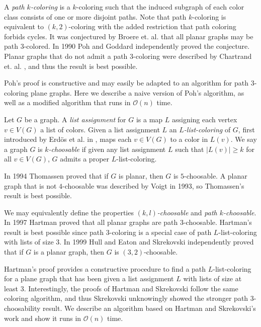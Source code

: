 \documentclass[letterpaper, 12pt]{article}
\theoremstyle{definition}
\theoremstyle{definition}
\theoremstyle{thm}
\theoremstyle{definition}
\begin{document}
A \textit{path $k$-coloring} is a
$k$-coloring such that the induced subgraph of each color class consists of one
or more disjoint paths. Note that path $k$-coloring is equivalent to
$(k,2)$-coloring with the added restriction that path coloring forbids cycles.
It was conjectured by Broere et. al. \cite{broere} that all planar graphs may
be path $3$-colored. In 1990 Poh \cite{poh} and Goddard \cite{goddard}
independently proved the conjecture. Planar graphs that do not admit a path $3$-coloring
were described by Chartrand et. al. \cite{kronk}, and thus the result is best possible.

Poh's proof is constructive and may easily be adapted to an algorithm for path
$3$-coloring plane graphs. Here we describe a naive version of Poh's algorithm,
as well as a modified algorithm that runs in $\mathcal{O}(n)$ time.

Let $G$ be a graph. A \textit{list assignment} for $G$ is a map $L$ assigning
each vertex $v\in V(G)$ a list of colors. Given a list assignment $L$ an
\textit{$L$-list-coloring} of $G$, first introduced
by Erd{\"o}s et al. in \cite{erdos}, maps each $v\in V(G)$ to a color in $L(v)$.
We say a graph $G$ is \textit{$k$-choosable} if given any list assignment $L$ such that
$|L(v)|\ge k$ for all $v\in V(G)$, $G$ admits a proper $L$-list-coloring.

In 1994 Thomassen \cite{thomassen} proved that if $G$ is planar, then $G$ is
$5$-choosable. A planar graph that is not $4$-choosable was
described by Voigt \cite{voigt} in 1993, so Thomassen's result is best possible.

We may equivalently define the properties \textit{$(k,l)$-choosable} and
\textit{path $k$-choosable}. In 1997 Hartman \cite{hartman} proved that all
planar graphs are path $3$-choosable. Hartman's result is best possible since
path $3$-coloring is a special case of path $L$-list-coloring with lists of size
$3$. In 1999 Hull and Eaton \cite{hull} and Skrekovski \cite{skrekovski}
independently proved that if $G$ is a planar graph, then $G$ is
$(3,2)$-choosable.

Hartman's proof provides a constructive procedure to find a path
$L$-list-coloring for a plane graph that has been given a list assignment $L$
with lists of size at least $3$. Interestingly, the proofs of Hartman and
Skrekovski follow the same coloring algorithm, and thus Skrekovski unknowingly
showed the stronger path $3$-choosability result. We describe an algorithm
based on Hartman and Skrekovski's work and show it runs in $\mathcal{O}(n)$
time.
\end{document}
